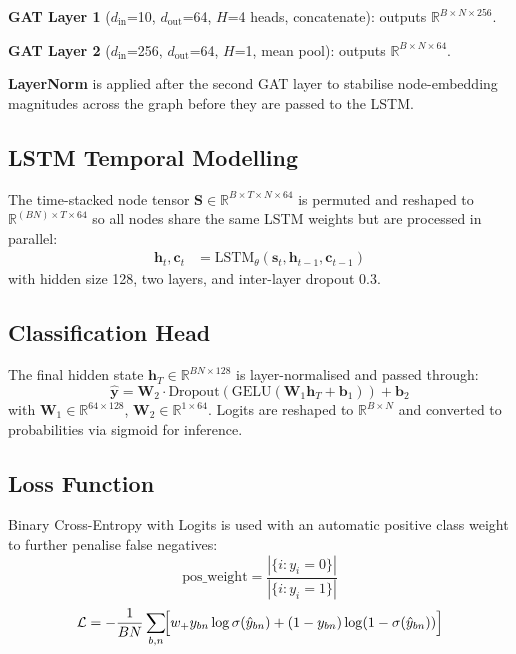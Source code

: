 \documentclass[conference]{IEEEtran}
\begin{document}
\noindent\textbf{GAT Layer 1} ($d_{\text{in}}$=10, $d_{\text{out}}$=64,
$H$=4 heads, concatenate): outputs $\mathbb{R}^{B\times N\times 256}$.

\noindent\textbf{GAT Layer 2} ($d_{\text{in}}$=256, $d_{\text{out}}$=64,
$H$=1, mean pool): outputs $\mathbb{R}^{B\times N\times 64}$.

\noindent\textbf{LayerNorm} is applied after the second GAT layer to
stabilise node-embedding magnitudes across the graph before they are
passed to the LSTM.

\subsection{LSTM Temporal Modelling}

The time-stacked node tensor
$\mathbf{S}\in\mathbb{R}^{B\times T\times N\times 64}$ is permuted and
reshaped to $\mathbb{R}^{(BN)\times T\times 64}$ so all nodes share the
same LSTM weights but are processed in parallel:
\begin{align}
  \mathbf{h}_t, \mathbf{c}_t &= \text{LSTM}_\theta(\mathbf{s}_t,
    \mathbf{h}_{t-1}, \mathbf{c}_{t-1})
  \label{eq:lstm}
\end{align}
with hidden size 128, two layers, and inter-layer dropout 0.3.

\subsection{Classification Head}

The final hidden state $\mathbf{h}_T \in \mathbb{R}^{BN\times 128}$
is layer-normalised and passed through:
\begin{equation}
  \hat{\mathbf{y}} =
  \mathbf{W}_2 \cdot \text{Dropout}\!\left(
    \text{GELU}(\mathbf{W}_1 \mathbf{h}_T + \mathbf{b}_1)
  \right) + \mathbf{b}_2
  \label{eq:head}
\end{equation}
with $\mathbf{W}_1\in\mathbb{R}^{64\times 128}$,
$\mathbf{W}_2\in\mathbb{R}^{1\times 64}$.
Logits are reshaped to $\mathbb{R}^{B\times N}$ and converted to
probabilities via sigmoid for inference.

\subsection{Loss Function}

Binary Cross-Entropy with Logits is used with an automatic positive
class weight to further penalise false negatives:
\begin{equation}
  \text{pos\_weight} = \frac{|\{i : y_i=0\}|}{|\{i : y_i=1\}|}
  \label{eq:posw}
\end{equation}
\begin{equation}
  \mathcal{L} = -\frac{1}{BN}\sum_{b,n}\!\Bigl[
    w_+ y_{bn}\log\sigma(\hat{y}_{bn})
  + (1-y_{bn})\log(1-\sigma(\hat{y}_{bn}))
  \Bigr]
  \label{eq:loss}
\end{equation}
\end{document}
